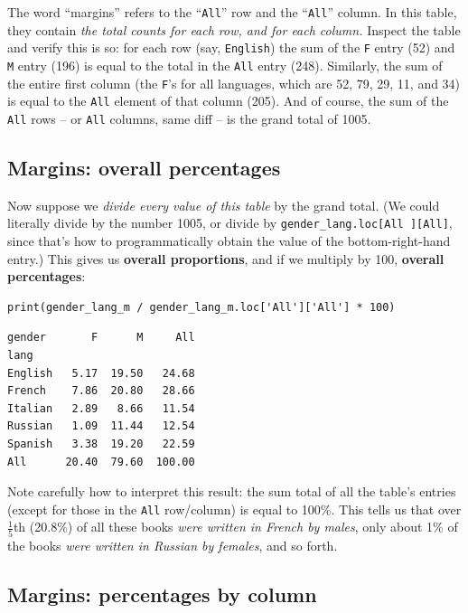 The word ``margins'' refers to the ``\texttt{All}'' row and the
``\texttt{All}'' column. In this table, they contain \textit{the total counts
for each row, and for each column.} Inspect the table and verify this is so:
for each row (say, \texttt{English}) the sum of the \texttt{F} entry (52) and
\texttt{M} entry (196) is equal to the total in the \texttt{All} entry (248).
Similarly, the sum of the entire first column (the \texttt{F}'s for all
languages, which are 52, 79, 29, 11, and 34) is equal to the \texttt{All}
element of that column (205). And of course, the sum of the \texttt{All} rows
-- or \texttt{All} columns, same diff -- is the grand total of 1005.

\subsection{Margins: overall percentages}

Now suppose we \textit{divide every value of this table} by the grand total.
(We could literally divide by the number 1005, or divide by
\texttt{gender\_lang.loc[\textquotesingle All\textquotesingle
][\textquotesingle All\textquotesingle ]}, since that's how to programmatically
obtain the value of the bottom-right-hand entry.) This gives us \textbf{overall
proportions}, and if we multiply by 100, \textbf{overall percentages}:

\begin{Verbatim}[fontsize=\footnotesize,samepage=true,frame=single,framesep=3mm]
print(gender_lang_m / gender_lang_m.loc['All']['All'] * 100)
\end{Verbatim}
\vspace{-.2in}

\begin{Verbatim}[fontsize=\small,samepage=true,frame=leftline,framesep=5mm,framerule=1mm]
gender       F      M     All
lang
English   5.17  19.50   24.68
French    7.86  20.80   28.66
Italian   2.89   8.66   11.54
Russian   1.09  11.44   12.54
Spanish   3.38  19.20   22.59
All      20.40  79.60  100.00
\end{Verbatim}

Note carefully how to interpret this result: the sum total of all the table's
entries (except for those in the \texttt{All} row/column) is equal to 100\%.
This tells us that over $\frac{1}{5}$th (20.8\%) of all these books
\textit{were written in French by males}, only about 1\% of the books
\textit{were written in Russian by females}, and so forth.

\subsection{Margins: percentages by column}

